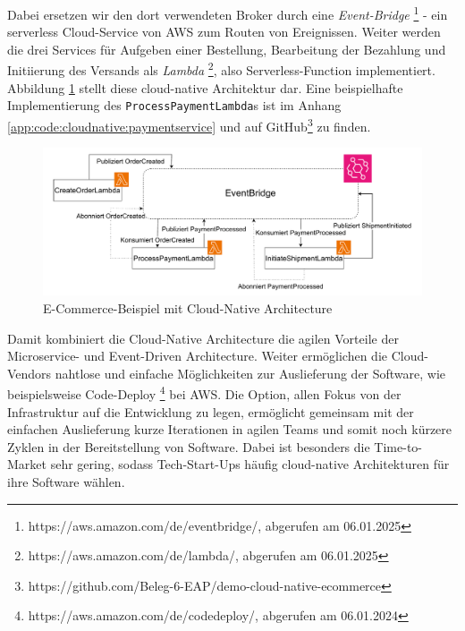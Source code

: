 \documentclass[acmtog]{acmart}
\begin{document}
Dabei ersetzen wir den dort verwendeten Broker durch eine \textit{Event-Bridge} \footnote{https://aws.amazon.com/de/eventbridge/, abgerufen am 06.01.2025}
- ein serverless Cloud-Service von AWS zum Routen von Ereignissen.
Weiter werden die drei Services für Aufgeben einer Bestellung, Bearbeitung der Bezahlung und Initiierung des Versands als \textit{Lambda} \footnote{https://aws.amazon.com/de/lambda/, abgerufen am 06.01.2025},
also Serverless-Function implementiert.
Abbildung \ref{fig:cloudnativeecommerce} stellt diese cloud-native Architektur dar.
Eine beispielhafte Implementierung des \texttt{ProcessPaymentLambda}s ist im Anhang \ref{app:code:cloudnative:paymentservice} und auf GitHub\footnote{https://github.com/Beleg-6-EAP/demo-cloud-native-ecommerce} zu finden.
\begin{figure}[!h]
  \centering
  \includegraphics[width=\linewidth]{images/cloud-native/cloud-native-ecommerce.drawio}
  \caption{E-Commerce-Beispiel mit Cloud-Native Architecture}
  \label{fig:cloudnativeecommerce}
\end{figure}

Damit kombiniert die Cloud-Native Architecture die agilen Vorteile der Microservice- und Event-Driven Architecture.
Weiter ermöglichen die Cloud-Vendors nahtlose und einfache Möglichkeiten zur Auslieferung der Software,
wie beispielsweise Code-Deploy \footnote{https://aws.amazon.com/de/codedeploy/, abgerufen am 06.01.2024} bei AWS\@.
Die Option, allen Fokus von der Infrastruktur auf die Entwicklung zu legen, ermöglicht gemeinsam mit der einfachen Auslieferung kurze Iterationen in agilen Teams
und somit noch kürzere Zyklen in der Bereitstellung von Software.
Dabei ist besonders die Time-to-Market sehr gering, sodass Tech-Start-Ups häufig cloud-native Architekturen für ihre Software wählen. %
\end{document}
